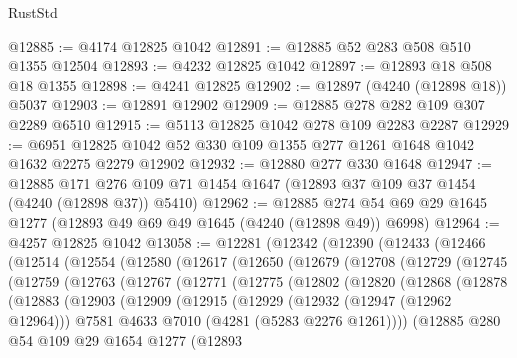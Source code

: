 \begin{lexlean}{RustStd}
\begin{coremodule}
@12885 := @4174 @12825 @1042
@12891 := @12885 @52 @283 @508 @510 @1355 @12504
@12893 := @4232 @12825 @1042
@12897 := @12893 @18 @508 @18 @1355
@12898 := @4241 @12825
@12902 := @12897 (@4240 (@12898 @18)) @5037
@12903 := @12891 @12902
@12909 := @12885 @278 @282 @109 @307 @2289 @6510
@12915 := @5113 @12825 @1042 @278 @109 @2283 @2287
@12929 := @6951 @12825 @1042 @52 @330 @109 @1355 @277 @1261 @1648 @1042 @1632 @2275 @2279 @12902
@12932 := @12880 @277 @330 @1648
@12947 := @12885
    @171
    @276
    @109
    @71
    @1454
    @1647
    (@12893 @37 @109 @37 @1454 (@4240 (@12898 @37)) @5410)
@12962 := @12885 @274 @54 @69 @29 @1645 @1277 (@12893 @49 @69 @49 @1645 (@4240 (@12898 @49)) @6998)
@12964 := @4257 @12825 @1042
@13058 := @12281
    (@12342
      (@12390
        (@12433
          (@12466
            (@12514
              (@12554
                (@12580
                  (@12617
                    (@12650
                      (@12679
                        (@12708
                          (@12729
                            (@12745
                              (@12759
                                (@12763
                                  (@12767
                                    (@12771
                                      (@12775
                                        (@12802
                                          (@12820
                                            (@12868
                                              (@12878
                                                (@12883
                                                  (@12903
                                                    (@12909
                                                      (@12915
                                                        (@12929
                                                          (@12932 (@12947 (@12962 @12964)))
                                                          @7581
                                                          @4633
                                                          @7010
                                                          (@4281 (@5283 @2276 @1261))))
                                                      (@12885
                                                        @280
                                                        @54
                                                        @109
                                                        @29
                                                        @1654
                                                        @1277
                                                        (@12893

\end{coremodule}
\end{lexlean}
